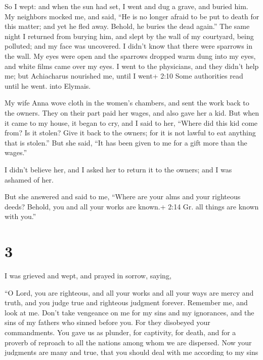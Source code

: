  So I wept: and when the sun had set, I went and dug a
grave, and buried him.  My neighbors mocked me, and said,
``He is no longer afraid to be put to death for this matter; and yet he
fled away. Behold, he buries the dead again.''  The same
night I returned from burying him, and slept by the wall of my
courtyard, being polluted; and my face was uncovered.  I
didn't know that there were sparrows in the wall. My eyes were open and
the sparrows dropped warm dung into my eyes, and white films came over
my eyes. I went to the physicians, and they didn't help me; but
Achiacharus nourished me, until I went+ 2:10 Some authorities read until
he went. into Elymais.

 My wife Anna wove cloth in the women's chambers,
 and sent the work back to the owners. They on their part
paid her wages, and also gave her a kid.  But when it came
to my house, it began to cry, and I said to her, ``Where did this kid
come from? Is it stolen? Give it back to the owners; for it is not
lawful to eat anything that is stolen.''  But she said,
``It has been given to me for a gift more than the wages.''

I didn't believe her, and I asked her to return it to the owners; and I
was ashamed of her.

But she answered and said to me, ``Where are your alms and your
righteous deeds? Behold, you and all your works are known.+ 2:14 Gr. all
things are known with you.''

\hypertarget{section-2}{%
\section{3}\label{section-2}}

 I was grieved and wept, and prayed in sorrow, saying,

 ``O Lord, you are righteous, and all your works and all
your ways are mercy and truth, and you judge true and righteous judgment
forever.  Remember me, and look at me. Don't take vengeance
on me for my sins and my ignorances, and the sins of my fathers who
sinned before you.  For they disobeyed your commandments.
You gave us as plunder, for captivity, for death, and for a proverb of
reproach to all the nations among whom we are dispersed. 
Now your judgments are many and true, that you should deal with me
according to my sins and the sins of my fathers, because we didn't keep
your commandments, for we didn't walk in truth before you. 
Now deal with me according to that which is pleasing in your sight.
Command my spirit to be taken from me, that I may be released, and
become earth. For it is more profitable for me to die rather than to
live, because I have heard false reproaches, and there is much sorrow in
me. Command that I be released from my distress, now, and go to the
everlasting place. Don't turn your face away from me.''

